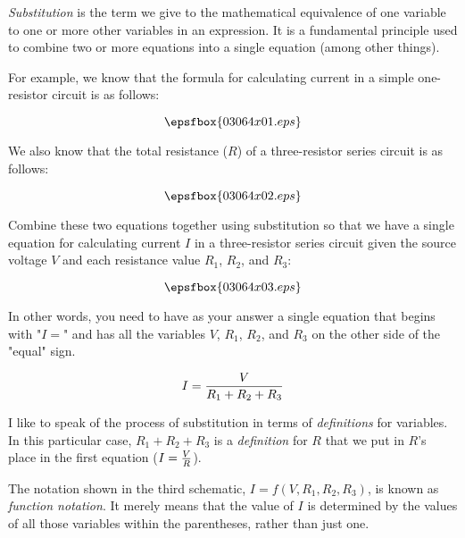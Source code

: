 

{\it Substitution} is the term we give to the mathematical equivalence of one variable to one or more other variables in an expression.  It is a fundamental principle used to combine two or more equations into a single equation (among other things).

For example, we know that the formula for calculating current in a simple one-resistor circuit is as follows:

$$\epsfbox{03064x01.eps}$$

We also know that the total resistance ($R$) of a three-resistor series circuit is as follows:

$$\epsfbox{03064x02.eps}$$

Combine these two equations together using substitution so that we have a single equation for calculating current $I$ in a three-resistor series circuit given the source voltage $V$ and each resistance value $R_1$, $R_2$, and $R_3$:

$$\epsfbox{03064x03.eps}$$

In other words, you need to have as your answer a single equation that begins with "$I =$" and has all the variables $V$, $R_1$, $R_2$, and $R_3$ on the other side of the "equal" sign.







$$I = {V \over {R_1 + R_2 + R_3}}$$







I like to speak of the process of substitution in terms of {\it definitions} for variables.  In this particular case, $R_1 + R_2 + R_3$ is a {\it definition} for $R$ that we put in $R$'s place in the first equation ($I = {V \over R}$).

The notation shown in the third schematic, $I = f(V, R_1, R_2, R_3)$, is known as {\it function notation}.  It merely means that the value of $I$ is determined by the values of all those variables within the parentheses, rather than just one.




